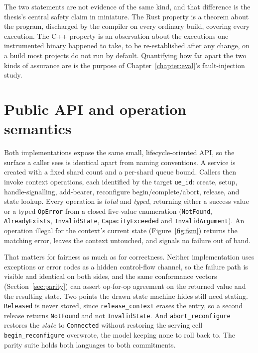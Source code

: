 The two statements are not evidence of the same kind, and that difference is the thesis's central
safety claim in miniature. The Rust property is a theorem about the program, discharged by the
compiler on every ordinary build, covering every execution. The C++ property is an observation
about the executions one instrumented binary happened to take, to be re-established after any
change, on a build most projects do not run by default. Quantifying how far apart the two kinds of
assurance are is the purpose of Chapter~\ref{chapter:eval}'s fault-injection study.

\section{Public API and operation semantics}
Both implementations expose the same small, lifecycle-oriented API, so the surface a caller sees
is identical apart from naming conventions. A service is created with a fixed shard count and a
per-shard queue bound. Callers then invoke context operations, each identified by the target
\texttt{ue\_id}: create, setup, handle-signalling, add-bearer, reconfigure
begin/complete/abort, release, and state lookup. Every operation is \emph{total} and
\emph{typed}, returning either a success value or a typed \texttt{OpError} from a closed
five-value enumeration (\texttt{NotFound}, \texttt{AlreadyExists}, \texttt{InvalidState},
\texttt{CapacityExceeded} and \texttt{InvalidArgument}). An operation illegal for the context's
current state (Figure~\ref{fig:fsm}) returns the matching error, leaves the context untouched,
and signals no failure out of band.

That matters for fairness as much as for correctness. Neither implementation uses
exceptions or error codes as a hidden control-flow channel, so the failure path is visible and
identical on both sides, and the same conformance vectors (Section~\ref{sec:parity}) can assert
op-for-op agreement on the returned value and the resulting state. Two points the drawn state
machine hides still need stating. \texttt{Released} is never stored, since
\texttt{release\_context} erases the entry, so a second release returns \texttt{NotFound} and not
\texttt{InvalidState}. And \texttt{abort\_reconfigure} restores the \emph{state} to
\texttt{Connected} without restoring the serving cell \texttt{begin\_reconfigure} overwrote, the
model keeping none to roll back to. The parity suite holds both languages to both commitments.

